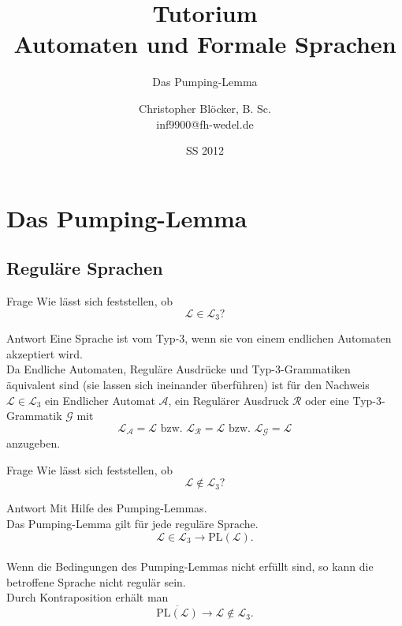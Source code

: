 \documentclass[]{beamer}
\author[Christopher Blöcker, B. Sc.]{Christopher Blöcker, B. Sc.\\ inf9900@fh-wedel.de}
\title[AFS Tutorium]{Tutorium\\Automaten und Formale Sprachen}
\date{SS 2012}
\subtitle{Das Pumping-Lemma}
\begin{document}
\begin{frame}
  \titlepage
\end{frame}

\section{Das Pumping-Lemma}
\subsection{Reguläre Sprachen}
\begin{frame}[squeeze]{}
  \begin{alertblock}{Frage}
    Wie lässt sich feststellen, ob
      \[\mathcal{L} \in \mathcal{L}_3 \text{?}\]
  \end{alertblock}
  
  \pause
  
  \begin{exampleblock}{Antwort}
    Eine Sprache ist vom Typ-3, wenn sie von einem endlichen Automaten akzeptiert wird. \\
    \vspace*{0.5em}
    \pause
    Da Endliche Automaten, Reguläre Ausdrücke und Typ-3-Grammatiken äquivalent sind (sie lassen sich ineinander überführen) ist für den Nachweis $\mathcal{L} \in \mathcal{L}_3$ ein Endlicher Automat $\mathcal{A}$, ein Regulärer Ausdruck $\mathcal{R}$ oder eine Typ-3-Grammatik $\mathcal{G}$ mit
      \[\mathcal{L_A} = \mathcal{L} \text{ bzw. } \mathcal{L_R} = \mathcal{L} \text{ bzw. } \mathcal{L_G} = \mathcal{L}\]
    anzugeben.
  \end{exampleblock}
\end{frame}

\begin{frame}[squeeze]{}
  \begin{alertblock}{Frage}
    Wie lässt sich feststellen, ob
      \[\mathcal{L} \notin \mathcal{L}_3 \text{?}\]
  \end{alertblock}
  
  \pause
  
  \begin{exampleblock}{Antwort}
    Mit Hilfe des Pumping-Lemmas. \\
    \vspace*{0.5em}
    \pause
    Das Pumping-Lemma gilt für jede reguläre Sprache.
      \[\mathcal{L} \in \mathcal{L}_3 \to \mathrm{PL} \left( \mathcal{L} \right).\]\\
    \vspace*{0.5em}
    \pause
    Wenn die Bedingungen des Pumping-Lemmas nicht erfüllt sind, so kann die betroffene Sprache nicht regulär sein. \\
    \vspace*{0.5em}
    Durch Kontraposition erhält man
      \[\overline{\mathrm{PL}(\mathcal{L})} \to \mathcal{L} \notin \mathcal{L}_3.\]
  \end{exampleblock}
\end{frame}
\end{document}
